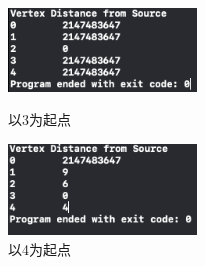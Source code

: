 \documentclass{article}
\begin{document}
\begin{figure}[htb]
    \centering
\begin{minipage}[t]{0.48\textwidth}
    \centering
    \includegraphics[width=5cm]{3.png}
    \caption{以3为起点}
\end{minipage}
\begin{minipage}[t]{0.48\textwidth}
    \centering
    \includegraphics[width=5cm]{4.png}
    \caption{以4为起点}
\end{minipage}
\end{figure}
\end{document}
